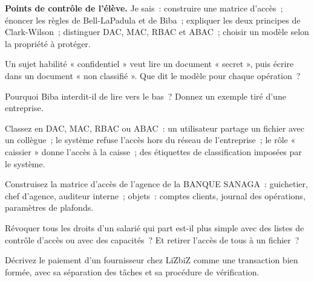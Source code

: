 \begin{boxinfo}
\textbf{Points de contrôle de l'élève.} Je sais~: construire une matrice
d'accès~; énoncer les règles de Bell-LaPadula et de Biba~; expliquer les
deux principes de Clark-Wilson~; distinguer DAC, MAC, RBAC et ABAC~;
choisir un modèle selon la propriété à protéger.
\end{boxinfo}

\bigskip

\begin{boxexo}[title={\ding{45}\quad Exercice~13.1. Bell-LaPadula \niveaubase}]
Un sujet habilité « confidentiel » veut lire un document « secret », puis
écrire dans un document « non classifié ». Que dit le modèle pour chaque
opération~?
\end{boxexo}

\begin{boxexo}[title={\ding{45}\quad Exercice~13.2. Biba \niveaubase}]
Pourquoi Biba interdit-il de lire vers le bas~? Donnez un exemple tiré
d'une entreprise.
\end{boxexo}

\begin{boxexo}[title={\ding{45}\quad Exercice~13.3. Quelle politique~? \niveaubase}]
Classez en DAC, MAC, RBAC ou ABAC~: un utilisateur partage un fichier avec
un collègue~; le système refuse l'accès hors du réseau de l'entreprise~;
le rôle « caissier » donne l'accès à la caisse~; des étiquettes de
classification imposées par le système.
\end{boxexo}

\begin{boxexo}[title={\ding{45}\quad Exercice~13.4. La matrice \niveaumoyen}]
Construisez la matrice d'accès de l'agence de la BANQUE SANAGA~: guichetier,
chef d'agence, auditeur interne~; objets~: comptes clients, journal des
opérations, paramètres de plafonds.
\end{boxexo}

\begin{boxexo}[title={\ding{45}\quad Exercice~13.5. Listes ou capacités \niveaumoyen}]
Révoquer tous les droits d'un salarié qui part est-il plus simple avec
des listes de contrôle d'accès ou avec des capacités~? Et retirer l'accès
de tous à un fichier~?
\end{boxexo}

\begin{boxexo}[title={\ding{45}\quad Exercice~13.6. Clark-Wilson \niveaumoyen}]
Décrivez le paiement d'un fournisseur chez LiZbiZ comme une transaction
bien formée, avec sa séparation des tâches et sa procédure de vérification.
\end{boxexo}

